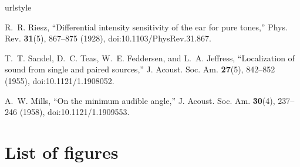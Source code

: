 \documentclass[12pt,oneside]{article}
\renewcommand{\url}{\begingroup \def\UrlLeft{}\def\UrlRight{}\urlstyle{same}\Url}
\begin{document}
\begin{thebibliography}{1}
\newcommand{\enquote}[1]{``#1''}
\providecommand{\url}[1]{\texttt{#1}}
\providecommand{\urlprefix}{URL }
\expandafter\ifx\csname urlstyle\endcsname\relax
  \providecommand{\doi}[1]{doi:\discretionary{}{}{}#1}\else
  \providecommand{\doi}{doi:\discretionary{}{}{}\begingroup
  \urlstyle{rm}\Url}\fi

R.~R. Riesz, \enquote{Differential intensity sensitivity of the ear for pure
  tones,} Phys. Rev. \textbf{31}(5), 867--875 (1928),
  \doi{10.1103/PhysRev.31.867}.

T.~T. Sandel, D.~C. Teas, W.~E. Feddersen, and L.~A. Jeffress,
  \enquote{Localization of sound from single and paired sources,} J. Acoust.
  Soc. Am. \textbf{27}(5), 842--852 (1955), \doi{10.1121/1.1908052}.

A.~W. Mills, \enquote{On the minimum audible angle,} J. Acoust. Soc. Am.
  \textbf{30}(4), 237--246 (1958), \doi{10.1121/1.1909553}.

\end{thebibliography}


\cleardoublepage
\processdelayedfloats
\cleardoublepage
\section*{List of figures}
\end{document}
